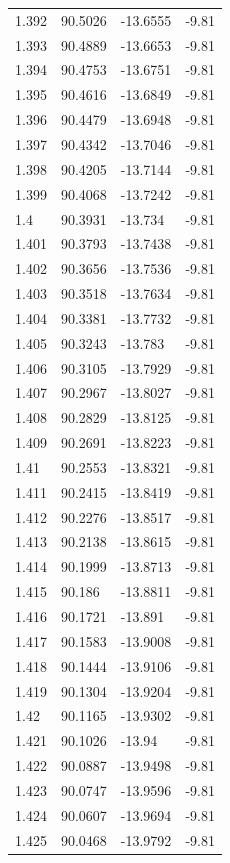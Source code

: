 \begin{tabular}{llll}
1.392 & 90.5026 & -13.6555 & -9.81 \\
1.393 & 90.4889 & -13.6653 & -9.81 \\
1.394 & 90.4753 & -13.6751 & -9.81 \\
1.395 & 90.4616 & -13.6849 & -9.81 \\
1.396 & 90.4479 & -13.6948 & -9.81 \\
1.397 & 90.4342 & -13.7046 & -9.81 \\
1.398 & 90.4205 & -13.7144 & -9.81 \\
1.399 & 90.4068 & -13.7242 & -9.81 \\
1.4 & 90.3931 & -13.734 & -9.81 \\
1.401 & 90.3793 & -13.7438 & -9.81 \\
1.402 & 90.3656 & -13.7536 & -9.81 \\
1.403 & 90.3518 & -13.7634 & -9.81 \\
1.404 & 90.3381 & -13.7732 & -9.81 \\
1.405 & 90.3243 & -13.783 & -9.81 \\
1.406 & 90.3105 & -13.7929 & -9.81 \\
1.407 & 90.2967 & -13.8027 & -9.81 \\
1.408 & 90.2829 & -13.8125 & -9.81 \\
1.409 & 90.2691 & -13.8223 & -9.81 \\
1.41 & 90.2553 & -13.8321 & -9.81 \\
1.411 & 90.2415 & -13.8419 & -9.81 \\
1.412 & 90.2276 & -13.8517 & -9.81 \\
1.413 & 90.2138 & -13.8615 & -9.81 \\
1.414 & 90.1999 & -13.8713 & -9.81 \\
1.415 & 90.186 & -13.8811 & -9.81 \\
1.416 & 90.1721 & -13.891 & -9.81 \\
1.417 & 90.1583 & -13.9008 & -9.81 \\
1.418 & 90.1444 & -13.9106 & -9.81 \\
1.419 & 90.1304 & -13.9204 & -9.81 \\
1.42 & 90.1165 & -13.9302 & -9.81 \\
1.421 & 90.1026 & -13.94 & -9.81 \\
1.422 & 90.0887 & -13.9498 & -9.81 \\
1.423 & 90.0747 & -13.9596 & -9.81 \\
1.424 & 90.0607 & -13.9694 & -9.81 \\
1.425 & 90.0468 & -13.9792 & -9.81 \\

\end{tabular}
